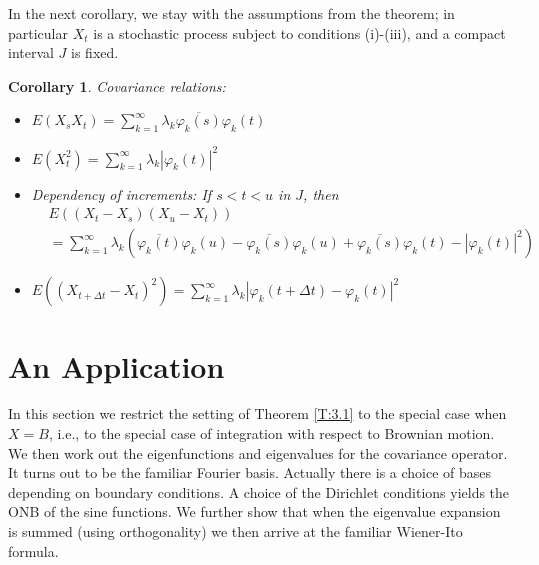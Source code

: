 \documentclass{amsart}
\newtheorem{corollary}[theorem]{Corollary}
\theoremstyle{definition}
\theoremstyle{remark}
\numberwithin{equation}{section}
\begin{document}
In the next corollary, we stay with the assumptions from the theorem; 
in particular $X_{t}$ is a stochastic process subject to conditions 
(i)-(iii), and a compact interval $J$ is fixed.

\begin{corollary}
\label{C:3.2}
Covariance relations:
\begin{itemize}
  \item $E(X_{s} X_{t})
   =\sum_{k=1}^{\infty}\lambda_{k}\overline{\varphi_{k}(s)}\varphi_{k}(t)$
  \item $E(X_{t}^{2}) =\sum_{k=1}^{\infty}\lambda_{k}|\varphi_{k}(t)|^{2}$
  \item Dependency of increments:  If $s<t<u$ in $J$, then
        \begin{align*}  
          &E((X_{t}-X_{s})(X_{u}-X_{t}))  \\
          &= \sum_{k=1}^{\infty}\lambda_{k}
          (\overline{\varphi_{k}(t)}\varphi_{k}(u)
          -\overline{\varphi_{k}(s)}\varphi_{k}(u) + 
          \overline{\varphi_{k}(s)}\varphi_{k}(t)-|\varphi_{k}(t)|^{2})
        \end{align*} 
  \item $E((X_{t+\Delta t} - X_{t})^{2})=\sum_{k=1}^{\infty}\lambda_{k}
    |\varphi_{k}(t+\Delta t)-\varphi_{k}(t)|^{2}$
\end{itemize}
\end{corollary}

\section{An Application}
\label{sec:4}

In this section we restrict the setting of Theorem \ref{T:3.1} to the 
special case when  $X = B$, i.e., to the special case of integration 
with respect to Brownian motion. We then work out the eigenfunctions 
and eigenvalues for the covariance operator. It turns out to be the 
familiar Fourier basis. Actually there is a choice of bases depending on 
boundary conditions. A choice of the Dirichlet conditions yields the ONB 
of the sine functions. We further show that when the eigenvalue expansion 
is summed (using orthogonality) we then arrive at the familiar Wiener-Ito 
formula.
\end{document}

